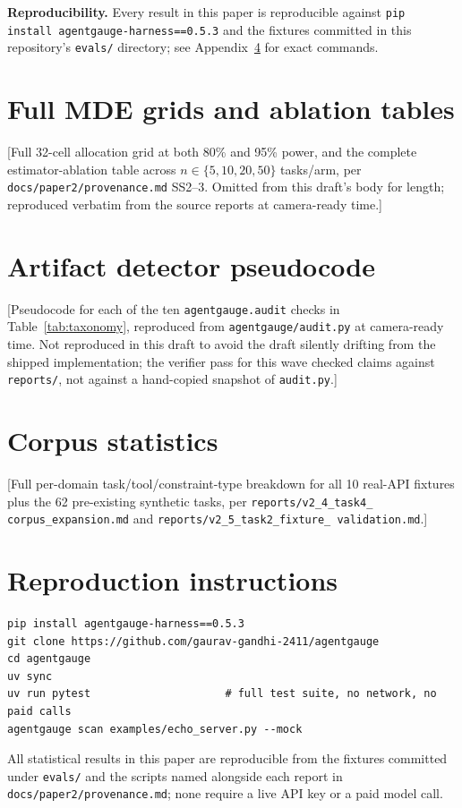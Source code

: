 \documentclass[11pt]{article}
\begin{document}
\textbf{Reproducibility.} Every result in this paper is reproducible against
\texttt{pip install\allowbreak\ agentgauge-\allowbreak harness==0.5.3} and the fixtures committed
in this repository's
\texttt{evals/} directory; see Appendix~\ref{app:repro} for exact commands.

\appendix

\section{Full MDE grids and ablation tables}
\label{app:grids}
[Full 32-cell allocation grid at both 80\% and 95\% power, and the complete estimator-ablation
table across $n\in\{5,10,20,50\}$ tasks/arm, per \texttt{docs/paper2/\allowbreak provenance.md}
SS2--3. Omitted
from this draft's body for length; reproduced verbatim from the source reports at camera-ready
time.]

\section{Artifact detector pseudocode}
\label{app:detectors}
[Pseudocode for each of the ten \texttt{agentgauge.audit} checks in Table~\ref{tab:taxonomy},
reproduced from \texttt{agentgauge/\allowbreak audit.py} at camera-ready time. Not reproduced in
this draft to
avoid the draft silently drifting from the shipped implementation; the verifier pass for this wave
checked claims against \texttt{reports/}, not against a hand-copied snapshot of \texttt{audit.py}.]

\section{Corpus statistics}
\label{app:corpus-stats}
[Full per-domain task/tool/constraint-type breakdown for all 10 real-API fixtures plus the 62
pre-existing synthetic tasks, per \texttt{reports/\allowbreak v2\_4\_\allowbreak task4\_\allowbreak
corpus\_\allowbreak expansion.md} and
\texttt{reports/\allowbreak v2\_5\_\allowbreak task2\_\allowbreak fixture\_\allowbreak
validation.md}.]

\section{Reproduction instructions}
\label{app:repro}
\begin{verbatim}
pip install agentgauge-harness==0.5.3
git clone https://github.com/gaurav-gandhi-2411/agentgauge
cd agentgauge
uv sync
uv run pytest                     # full test suite, no network, no paid calls
agentgauge scan examples/echo_server.py --mock
\end{verbatim}
All statistical results in this paper are reproducible from the fixtures committed under
\texttt{evals/} and the scripts named alongside each report in
\texttt{docs/paper2/provenance.md}; none require a live API key or a paid model call.
\end{document}
